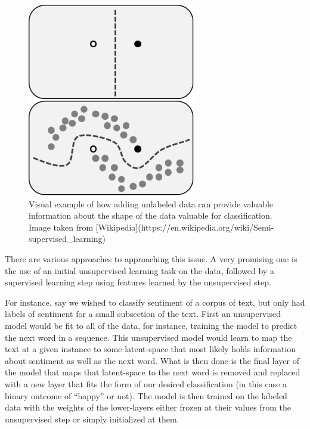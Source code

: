 \documentclass[]{book}
\theoremstyle{definition}
\theoremstyle{definition}
\theoremstyle{definition}
\theoremstyle{remark}
\begin{document}
\begin{figure}
\includegraphics[height=320]{figures/semi-supervised} \caption{Visual example of how adding unlabeled data can provide valuable information about the shape of the data valuable for classification. Image taken from [Wikipedia](https://en.wikipedia.org/wiki/Semi-supervised_learning)}\label{fig:semisupervised}
\end{figure}

There are various approaches to approaching this issue. A very promising
one is the use of an initial unsupervised learning task on the data,
followed by a supervised learning step using features learned by the
unsupervised step.

For instance, say we wished to classify sentiment of a corpus of text,
but only had labels of sentiment for a small subsection of the text.
First an unsupervised model would be fit to all of the data, for
instance, training the model to predict the next word in a sequence.
This unsupervised model would learn to map the text at a given instance
to some latent-space that most likely holds information about sentiment
as well as the next word. What is then done is the final layer of the
model that maps that latent-space to the next word is removed and
replaced with a new layer that fits the form of our desired
classification (in this case a binary outcome of ``happy'' or not). The
model is then trained on the labeled data with the weights of the
lower-layers either frozen at their values from the unsupervised step or
simply initialized at them.
\end{document}
